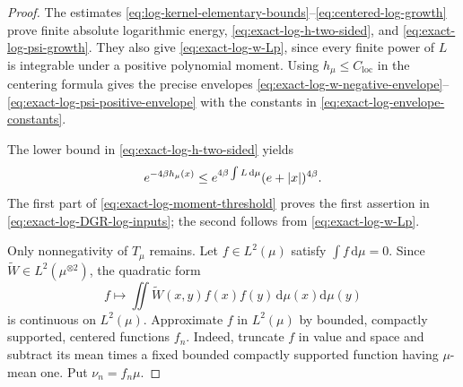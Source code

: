 \documentclass[11pt,reqno]{amsart}
\numberwithin{equation}{section}
\theoremstyle{plain}
\theoremstyle{remark}
\DeclarePairedDelimiter{\abs}{\lvert}{\rvert}
\newcommand{\md}{\mathrm{d}}
\newcommand{\tl}{\widetilde}
\newcommand{\be}{\beta}
\begin{document}
\begin{proof}

The estimates \eqref{eq:log-kernel-elementary-bounds}--\eqref{eq:centered-log-growth} prove finite absolute logarithmic energy, \eqref{eq:exact-log-h-two-sided}, and \eqref{eq:exact-log-psi-growth}.  They also give \eqref{eq:exact-log-w-Lp}, since every finite power of $L$ is integrable under a positive polynomial moment.  Using $h_\mu\leq C_{\mathrm{loc}}$ in the centering formula gives the precise envelopes \eqref{eq:exact-log-w-negative-envelope}--\eqref{eq:exact-log-psi-positive-envelope} with the constants in \eqref{eq:exact-log-envelope-constants}.

The lower bound in \eqref{eq:exact-log-h-two-sided} yields
\begin{equation}\label{eq:exact-log-exponential-h-bound}
 e^{-4\be h_\mu(x)}
 \leq
 e^{4\be\int L\,\md\mu}(e+\abs x)^{4\be}.
\end{equation}
The first part of \eqref{eq:exact-log-moment-threshold} proves the first assertion in \eqref{eq:exact-log-DGR-log-inputs}; the second follows from \eqref{eq:exact-log-w-Lp}.

Only nonnegativity of $T_\mu$ remains.  Let $f\in L^2(\mu)$ satisfy $\int f\,\md\mu=0$.  Since $\tl W\in L^2(\mu^{\otimes2})$, the quadratic form
\begin{equation}\label{eq:exact-log-quadratic-form-continuity}
 f\longmapsto\iint\tl W(x,y)f(x)f(y)\,\md\mu(x)\md\mu(y)
\end{equation}
is continuous on $L^2(\mu)$.  Approximate $f$ in $L^2(\mu)$ by bounded, compactly supported, centered functions $f_n$.  Indeed, truncate $f$ in value and space and subtract its mean times a fixed bounded compactly supported function having $\mu$-mean one.  Put $\nu_n=f_n\mu$.


\end{proof}
\end{document}
